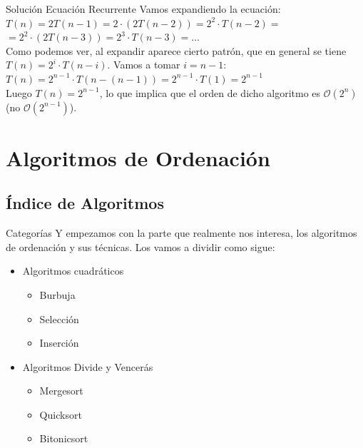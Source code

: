 \documentclass[compress]{beamer}
\begin{document}
\begin{frame}{Solución Ecuación Recurrente}
Vamos expandiendo la ecuación:\\
\vspace{0.20in}
$T(n) = 2T(n-1) = 2\cdot(2T(n-2)) = 2^2\cdot T(n-2) =$\\
$= 2^2\cdot(2T(n-3)) = 2^3\cdot T(n-3) =$...\\
\vspace{0.20in}
Como podemos ver, al expandir aparece cierto patrón, que en general se tiene $T(n) = 2^i\cdot T(n-i)$. Vamos a tomar $i=n-1$:\\
\vspace{0.20in}
$T(n) = 2^{n-1}\cdot T(n-(n-1)) = 2^{n-1}\cdot T(1) = 2^{n-1}$\\
\vspace{0.20in}
Luego $T(n) = 2^{n-1}$, lo que implica que el orden de dicho algoritmo es $\mathcal{O}(2^n)$ (no $\mathcal{O}(2^{n-1})$).
\end{frame}

\section{Algoritmos de Ordenación}
\subsection{Índice de Algoritmos}

\begin{frame}{Categorías}
Y empezamos con la parte que realmente nos interesa, los algoritmos de ordenación y sus técnicas. Los vamos a dividir como sigue:\\
	\begin{itemize}
	\item Algoritmos cuadráticos\\
		\begin{itemize}
		\item Burbuja
		\item Selección
		\item Inserción
		\end{itemize}
	\item Algoritmos Divide y Vencerás\\
		\begin{itemize}
		\item Mergesort
		\item Quicksort
		\item Bitonicsort
		\end{itemize}
	\end{itemize}
\end{frame}
\end{document}
